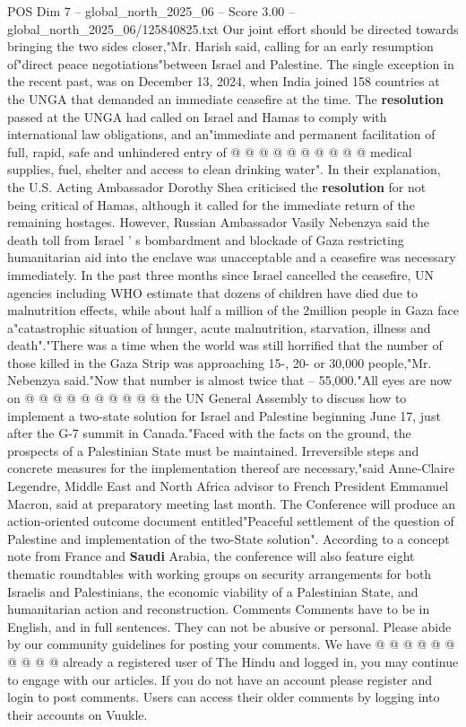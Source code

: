 \begin{textsample}{POS Dim 7 – global\_north\_2025\_06 – Score 3.00 – global\_north\_2025\_06/125840825.txt}
Our joint effort should be directed towards bringing the two sides closer,"Mr.
Harish said, calling for an early resumption of"direct peace negotiations"between Israel and Palestine.
The single exception in the recent past, was on December 13, 2024, when India joined 158 countries at the UNGA that demanded an immediate ceasefire at the time.
The \textbf{resolution} passed at the UNGA had called on Israel and Hamas to comply with international law obligations, and an"immediate and permanent facilitation of full, rapid, safe and unhindered entry of @ @ @ @ @ @ @ @ @ @ medical supplies, fuel, shelter and access to clean drinking water".
In their explanation, the U.S.
Acting Ambassador Dorothy Shea criticised the \textbf{resolution} for not being critical of Hamas, although it called for the immediate return of the remaining hostages.
However, Russian Ambassador Vasily Nebenzya said the death toll from Israel ' s bombardment and blockade of Gaza restricting humanitarian aid into the enclave was unacceptable and a ceasefire was necessary immediately.
In the past three months since Israel cancelled the ceasefire, UN agencies including WHO estimate that dozens of children have died due to malnutrition effects, while about half a million of the 2million people in Gaza face a"catastrophic situation of hunger, acute malnutrition, starvation, illness and death"."There was a time when the world was still horrified that the number of those killed in the Gaza Strip was approaching 15-, 20- or 30,000 people,"Mr.
Nebenzya said."Now that number is almost twice that -- 55,000."All eyes are now on @ @ @ @ @ @ @ @ @ @ the UN General Assembly to discuss how to implement a two-state solution for Israel and Palestine beginning June 17, just after the G-7 summit in Canada."Faced with the facts on the ground, the prospects of a Palestinian State must be maintained.
Irreversible steps and concrete measures for the implementation thereof are necessary,"said Anne-Claire Legendre, Middle East and North Africa advisor to French President Emmanuel Macron, said at preparatory meeting last month.
The Conference will produce an action-oriented outcome document entitled"Peaceful settlement of the question of Palestine and implementation of the two-State solution".
According to a concept note from France and \textbf{Saudi} Arabia, the conference will also feature eight thematic roundtables with working groups on security arrangements for both Israelis and Palestinians, the economic viability of a Palestinian State, and humanitarian action and reconstruction.
Comments Comments have to be in English, and in full sentences.
They can not be abusive or personal.
Please abide by our community guidelines for posting your comments.
We have @ @ @ @ @ @ @ @ @ @ already a registered user of The Hindu and logged in, you may continue to engage with our articles.
If you do not have an account please register and login to post comments.
Users can access their older comments by logging into their accounts on Vuukle.

\end{textsample}
